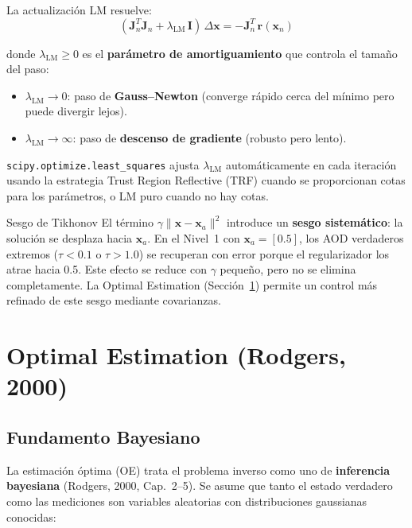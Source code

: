\documentclass[a4paper,11pt]{article}
\begin{document}
La actualizaci\'on LM resuelve:
\begin{equation}\label{eq:lm_update}
    (\mathbf{J}_n^T\mathbf{J}_n + \lambda_{\text{LM}}\,\mathbf{I})\,\Delta\mathbf{x}
    = -\mathbf{J}_n^T\,\mathbf{r}(\mathbf{x}_n)
\end{equation}

donde $\lambda_{\text{LM}} \geq 0$ es el \textbf{par\'ametro de amortiguamiento}
que controla el tama\~no del paso:
\begin{itemize}
    \item $\lambda_{\text{LM}} \to 0$: paso de \textbf{Gauss--Newton}
          (converge r\'apido cerca del m\'inimo pero puede divergir lejos).
    \item $\lambda_{\text{LM}} \to \infty$: paso de \textbf{descenso de gradiente}
          (robusto pero lento).
\end{itemize}

\texttt{scipy.optimize.least\_squares} ajusta $\lambda_{\text{LM}}$
autom\'aticamente en cada iteraci\'on usando la estrategia Trust Region
Reflective (TRF) cuando se proporcionan cotas para los par\'ametros, o LM
puro cuando no hay cotas.

\begin{physics}{Sesgo de Tikhonov}
El t\'ermino $\gamma\|\mathbf{x}-\mathbf{x}_a\|^2$ introduce un
\textbf{sesgo sistem\'atico}: la soluci\'on se desplaza hacia $\mathbf{x}_a$.
En el Nivel~1 con $\mathbf{x}_a = [0.5]$, los AOD verdaderos extremos
($\tau < 0.1$ o $\tau > 1.0$) se recuperan con error porque el regularizador
los atrae hacia 0.5.  Este efecto se reduce con $\gamma$ peque\~no, pero
no se elimina completamente.  La Optimal Estimation (Secci\'on~\ref{sec:oe})
permite un control m\'as refinado de este sesgo mediante covarianzas.
\end{physics}


\section{Optimal Estimation (Rodgers, 2000)}\label{sec:oe}

\subsection{Fundamento Bayesiano}

La estimaci\'on \'optima (OE) trata el problema inverso como uno de
\textbf{inferencia bayesiana} (Rodgers, 2000, Cap.~2--5).  Se asume que tanto
el estado verdadero como las mediciones son variables aleatorias con
distribuciones gaussianas conocidas:
\end{document}
